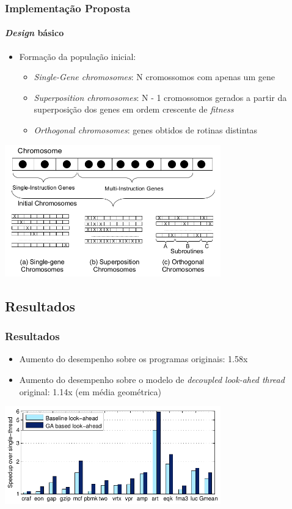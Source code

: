\documentclass[10pt]{beamer}
\begin{document}
\begin{frame}
\frametitle{Implementação Proposta}
\framesubtitle{\textit{Design} básico}

\begin{itemize}
  \item Formação da população inicial:
  \begin{itemize}
  	\item \textit{Single-Gene chromosomes}: N cromossomos com apenas um gene
  	\item \textit{Superposition chromosomes}: N - 1 cromossomos gerados a partir
  	da superposição dos genes em ordem crescente de \textit{fitness}
  	\item \textit{Orthogonal chromosomes}: genes obtidos de rotinas distintas
   \end{itemize}
\end{itemize}

 \centering
\includegraphics[width=0.7\textwidth]{images/initial}
\end{frame}

\subsection {Resultados}
\begin{frame}
\frametitle{Resultados}
\begin{itemize}
  \item Aumento do desempenho sobre os programas originais: 1.58x
  \item Aumento do desempenho sobre o modelo de \textit{decoupled look-ahed
  thread} original: 1.14x (em média geométrica)
\end{itemize}

\vspace{14pt}

\centering
\includegraphics[width=0.7\textwidth]{images/results}
\end{frame}
\end{document}

